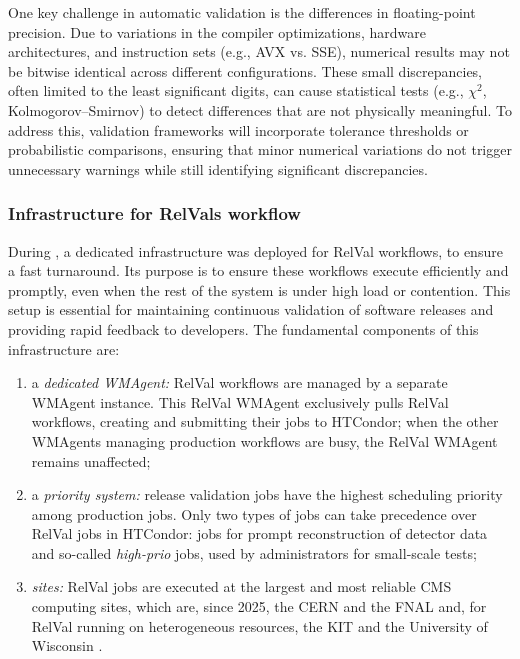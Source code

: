 One key challenge in automatic validation is the differences in floating-point precision. Due to variations in the compiler optimizations, hardware architectures, and instruction sets (e.g., \gls{AVX} vs. \gls{SSE}), numerical results may not be bitwise identical across different configurations. These small discrepancies, often limited to the least significant digits, can cause statistical tests (e.g., $\chi^2$, Kolmogorov--Smirnov) to detect differences that are not physically meaningful. To address this, validation frameworks will incorporate tolerance thresholds or probabilistic comparisons, ensuring that minor numerical variations do not trigger unnecessary warnings while still identifying significant discrepancies.

\subsubsection{Infrastructure for \glspl{RelVal} workflow}
\label{Validation:RelValInfra}
During \RunThree, a dedicated infrastructure was deployed for \gls{RelVal} workflows, to ensure a fast turnaround. Its purpose is to ensure these workflows execute efficiently and promptly, even when the rest of the system is under high load or contention. This setup is essential for maintaining continuous validation of software releases and providing rapid feedback to developers. The fundamental components of this infrastructure are:
\begin{enumerate}
    \item a \emph{dedicated WMAgent:} \gls{RelVal} workflows are managed by a separate WMAgent instance. This \gls{RelVal} WMAgent exclusively pulls \gls{RelVal} workflows, creating and submitting their jobs to HTCondor; when the other WMAgents managing production workflows are busy, the \gls{RelVal} WMAgent remains unaffected;
    \item a \emph{priority system:} release validation jobs have the highest scheduling priority among production jobs. Only two types of jobs can take precedence over \gls{RelVal} jobs in HTCondor: \TierZero jobs for prompt reconstruction of detector data and so-called \emph{high-prio} jobs, used by administrators for small-scale tests;
    \item \emph{sites:} \gls{RelVal} jobs are executed at the largest and most reliable CMS computing sites, which are, since 2025, the CERN \TierTwo and the \gls{FNAL} \TierOne and, for \gls{RelVal} running on heterogeneous resources, the KIT \TierOne and the University of Wisconsin \TierTwo.
\end{enumerate}

